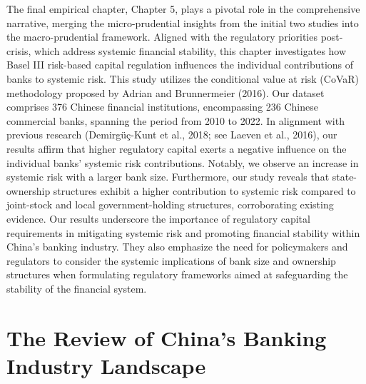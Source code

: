 \documentclass[
  12pt,
  a4paper,
]{scrreprt}
\begin{document}
The final empirical chapter, Chapter 5, plays a pivotal role in the
comprehensive narrative, merging the micro-prudential insights from the
initial two studies into the macro-prudential framework. Aligned with
the regulatory priorities post-crisis, which address systemic financial
stability, this chapter investigates how Basel III risk-based capital
regulation influences the individual contributions of banks to systemic
risk. This study utilizes the conditional value at risk (CoVaR)
methodology proposed by Adrian and Brunnermeier (2016). Our dataset
comprises 376 Chinese financial institutions, encompassing 236 Chinese
commercial banks, spanning the period from 2010 to 2022. In alignment
with previous research (Demirgüç-Kunt et al., 2018; see Laeven et al.,
2016), our results affirm that higher regulatory capital exerts a
negative influence on the individual banks' systemic risk contributions.
Notably, we observe an increase in systemic risk with a larger bank
size. Furthermore, our study reveals that state-ownership structures
exhibit a higher contribution to systemic risk compared to joint-stock
and local government-holding structures, corroborating existing
evidence. Our results underscore the importance of regulatory capital
requirements in mitigating systemic risk and promoting financial
stability within China's banking industry. They also emphasize the need
for policymakers and regulators to consider the systemic implications of
bank size and ownership structures when formulating regulatory
frameworks aimed at safeguarding the stability of the financial system.


\chapter{The Review of China's Banking Industry
Landscape}\label{the-review-of-chinas-banking-industry-landscape}
\end{document}
